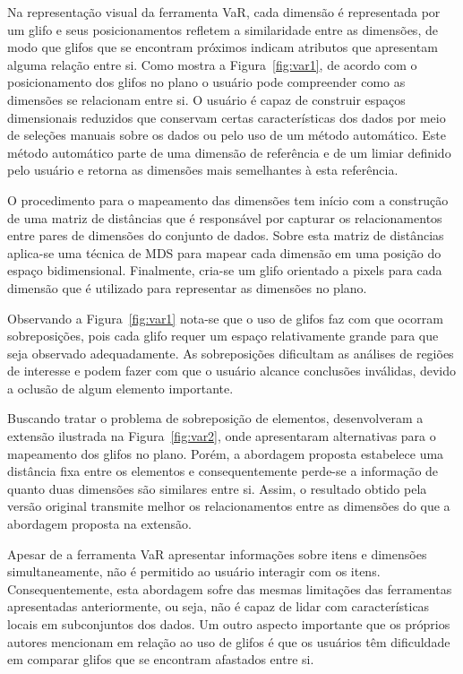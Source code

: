 Na representação visual da ferramenta VaR, cada dimensão é
representada por um glifo e seus posicionamentos refletem a
similaridade entre as dimensões, de modo que glifos que se
encontram próximos indicam atributos que apresentam alguma
relação entre si. Como mostra a Figura~\ref{fig:var1}, de
acordo com o posicionamento dos glifos no plano o usuário
pode compreender como as dimensões se relacionam entre si. O
usuário é capaz de construir espaços dimensionais reduzidos
que conservam certas características dos dados por meio de
seleções manuais sobre os dados ou pelo uso de um método automático.
Este método automático parte de uma dimensão de referência e
de um limiar definido pelo usuário e retorna as dimensões
mais semelhantes à esta referência.

O procedimento para o mapeamento das dimensões tem início
com a construção de uma matriz de distâncias que é
responsável por capturar os relacionamentos entre pares de
dimensões do conjunto de dados. Sobre esta matriz de
distâncias aplica-se uma técnica de MDS para mapear cada
dimensão em uma posição do espaço bidimensional.
Finalmente, cria-se um glifo orientado a pixels para cada
dimensão que é utilizado para representar as dimensões
no plano.

Observando a Figura~\ref{fig:var1} nota-se que o
uso de glifos faz com que ocorram sobreposições, pois cada
glifo requer um espaço relativamente grande para que seja
observado adequadamente.  As sobreposições dificultam as
análises de regiões de interesse e podem fazer com que o
usuário alcance conclusões inválidas, devido a oclusão de
algum elemento importante.  

Buscando tratar o problema de sobreposição de elementos,
\citet{Yang2007} desenvolveram a extensão ilustrada na
Figura~\ref{fig:var2}, onde apresentaram alternativas para o
mapeamento dos glifos no plano. Porém, a abordagem 
proposta estabelece uma distância fixa entre os elementos e
consequentemente perde-se a informação de quanto duas
dimensões são similares entre si. Assim, o resultado obtido
pela versão original transmite melhor os relacionamentos entre
as dimensões do que a abordagem proposta na extensão. 

Apesar de a ferramenta VaR apresentar informações sobre itens
e dimensões simultaneamente, não é permitido ao usuário
interagir com os itens. Consequentemente, esta abordagem
sofre das mesmas limitações das ferramentas apresentadas
anteriormente, ou seja, não é capaz de lidar com  
características locais em subconjuntos dos dados. Um outro
aspecto importante que os próprios autores mencionam em
relação ao uso de glifos é que os usuários têm dificuldade
em comparar glifos que se encontram afastados entre si. 

